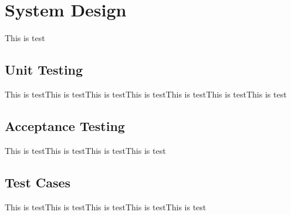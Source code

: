 \chapter{System Design}

This is test
\section{Unit Testing}
This is testThis is testThis is testThis is testThis is testThis is testThis is test

\section{Acceptance Testing}
This is testThis is testThis is testThis is test

\section{Test Cases}
This is testThis is testThis is testThis is testThis is test